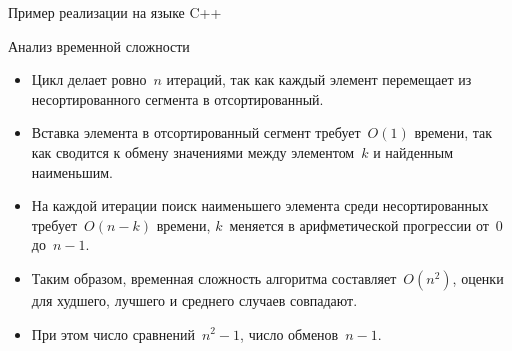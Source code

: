 \documentclass[landscape]{slides}
\begin{document}
\begin{slide}
  Пример реализации на языке C++

  
\end{slide}

\begin{slide}
  Анализ временной сложности
  \begin{itemize}
    \item Цикл делает ровно~$n$ итераций, так как каждый элемент перемещает из несортированного сегмента в отсортированный.
    \item Вставка элемента в отсортированный сегмент требует~$O(1)$ времени, так как сводится к обмену значениями между
      элементом~$k$ и найденным наименьшим.
    \item На каждой итерации поиск наименьшего элемента среди несортированных требует~$O(n-k)$ времени,
      $k$~меняется в арифметической прогрессии от~0 до~$n-1$.
    \item Таким образом, временная сложность алгоритма составляет~$O(n^2)$, оценки для худшего, лучшего и среднего случаев
      совпадают.
    \item При этом число сравнений~$n^2-1$, число обменов~$n-1$.
  \end{itemize}
\end{slide}
\end{document}

